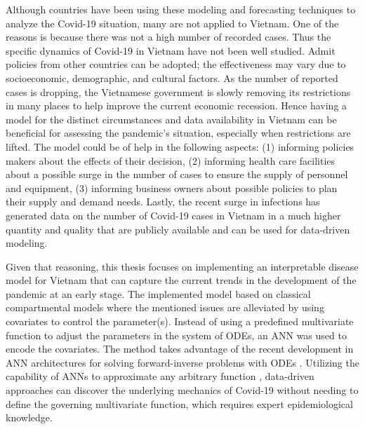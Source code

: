 Although countries have been using these modeling and forecasting techniques to analyze the Covid-19 situation, many are not applied to Vietnam.
One of the reasons is because there was not a high number of recorded cases.
Thus the specific dynamics of Covid-19 in Vietnam have not been well studied.
Admit policies from other countries can be adopted; the effectiveness may vary due to socioeconomic, demographic, and cultural factors.
As the number of reported cases is dropping, the Vietnamese government is slowly removing its restrictions in many places to help improve the current economic recession.
Hence having a model for the distinct circumstances and data availability in Vietnam can be beneficial for assessing the pandemic's situation, especially when restrictions are lifted.
The model could be of help in the following aspects: (1) informing policies makers about the effects of their decision, (2) informing health care facilities about a possible surge in the number of cases to ensure the supply of personnel and equipment, (3) informing business owners about possible policies to plan their supply and demand needs.
Lastly, the recent surge in infections has generated data on the number of Covid-19 cases in Vietnam in a much higher quantity and quality that are publicly available and can be used for data-driven modeling.

Given that reasoning, this thesis focuses on implementing an interpretable disease model for Vietnam that can capture the current trends in the development of the pandemic at an early stage.
The implemented model based on classical compartmental models where the mentioned issues are alleviated by using covariates to control the parameter(s).
Instead of using a predefined multivariate function to adjust the parameters in the system of \glspl{ODE}, an \gls{ANN} was used to encode the covariates.
The method takes advantage of the recent development in \gls{ANN} architectures for solving forward-inverse problems with \glspl{ODE} \cite{raissiPhysicsinformedNeuralNetworks2019, chenNeuralOrdinaryDifferential2019, rackauckasUniversalDifferentialEquations2020}.
Utilizing the capability of \glspl{ANN} to approximate any arbitrary function \cite{cybenkotApproximationSuperpositionsSigmoidal, hornikApproximationCapabilitiesMultilayer1991, hornikMultilayerFeedforwardNetworks1989}, data-driven approaches can discover the underlying mechanics of Covid-19 without needing to define the governing multivariate function, which requires expert epidemiological knowledge.

